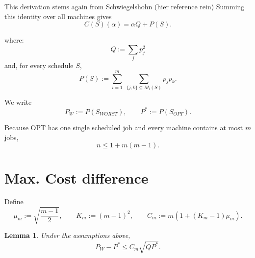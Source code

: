 \documentclass[11pt]{article}
\newtheorem{lemma}{Lemma}
\newcommand{\OPT}{\mathrm{OPT}}
\begin{document}
This derivation stems again from Schwiegelshohn (hier reference rein)
Summing this identity over all machines gives
\[
 C(S)(\alpha)=\alpha Q+P(S).
\tag{1}
\]

where: 
\[
 Q:=\sum_jp_j^2
\]
and, for every schedule \(S\),
\[
 P(S):=
 \sum_{i=1}^m\ \sum_{\{j,k\}\subseteq M_i(S)}p_jp_k.
\]

 We write
\[
 P_{W}:=P(S_{WORST}),\qquad P^*:=P(S_{OPT}).
\]

Because \(\OPT\) has one single scheduled job and every machine
contains at most \(m\) jobs,
\[
 n\le 1+m(m-1).
\tag{2}
\]

\section{Max. Cost difference}

Define
\[
 \mu_m:=\sqrt{\frac{m-1}{2}},
 \qquad
 K_m:=(m-1)^2,
 \qquad
 C_m:=m\left(1+(K_m-1)\mu_m\right).
\]

\begin{lemma}
\label{lemma: P_W-P*}
Under the assumptions above,
\[
 P_{W}-P^*\le C_m\sqrt{QP^*}.
\tag{3}
\]
\end{lemma}
\end{document}
